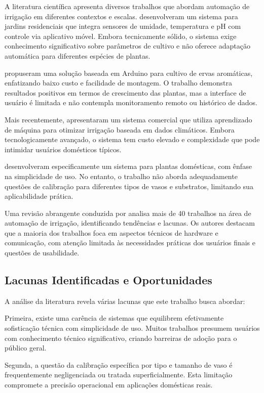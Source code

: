 \documentclass[twoside,english,brazilian]{UNISINOSmonografia}
\begin{document}
A literatura científica apresenta diversos trabalhos que abordam automação de irrigação em diferentes contextos e escalas.  desenvolveram um sistema para jardins residenciais que integra sensores de umidade, temperatura e pH com controle via aplicativo móvel. Embora tecnicamente sólido, o sistema exige conhecimento significativo sobre parâmetros de cultivo e não oferece adaptação automática para diferentes espécies de plantas.

 propuseram uma solução baseada em Arduino para cultivo de ervas aromáticas, enfatizando baixo custo e facilidade de montagem. O trabalho demonstra resultados positivos em termos de crescimento das plantas, mas a interface de usuário é limitada e não contempla monitoramento remoto ou histórico de dados.

Mais recentemente,  apresentaram um sistema comercial que utiliza aprendizado de máquina para otimizar irrigação baseada em dados climáticos. Embora tecnologicamente avançado, o sistema tem custo elevado e complexidade que pode intimidar usuários domésticos típicos.

 desenvolveram especificamente um sistema para plantas domésticas, com ênfase na simplicidade de uso. No entanto, o trabalho não aborda adequadamente questões de calibração para diferentes tipos de vasos e substratos, limitando sua aplicabilidade prática.

Uma revisão abrangente conduzida por  analisa mais de 40 trabalhos na área de automação de irrigação, identificando tendências e lacunas. Os autores destacam que a maioria dos trabalhos foca em aspectos técnicos de hardware e comunicação, com atenção limitada às necessidades práticas dos usuários finais e questões de usabilidade.

\subsection{Lacunas Identificadas e Oportunidades}

A análise da literatura revela várias lacunas que este trabalho busca abordar:

Primeira, existe uma carência de sistemas que equilibrem efetivamente sofisticação técnica com simplicidade de uso. Muitos trabalhos presumem usuários com conhecimento técnico significativo, criando barreiras de adoção para o público geral.

Segunda, a questão da calibração específica por tipo e tamanho de vaso é frequentemente negligenciada ou tratada superficialmente. Esta limitação compromete a precisão operacional em aplicações domésticas reais.
\end{document}
